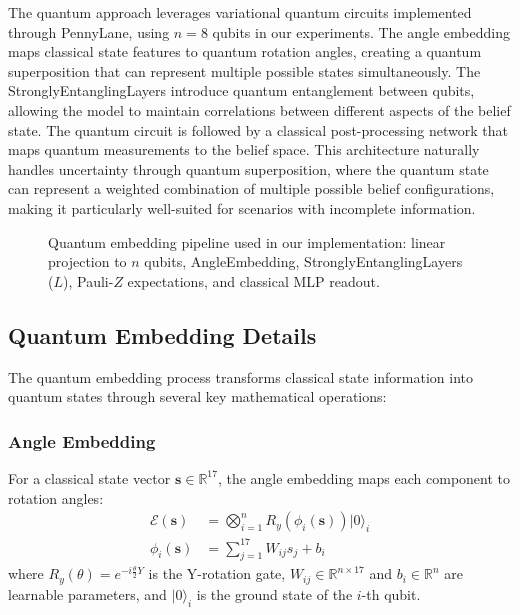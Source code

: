 \documentclass[11pt]{article}
\begin{document}
The quantum approach leverages variational quantum circuits implemented through PennyLane, using $n=8$ qubits in our experiments. The angle embedding maps classical state features to quantum rotation angles, creating a quantum superposition that can represent multiple possible states simultaneously. The StronglyEntanglingLayers introduce quantum entanglement between qubits, allowing the model to maintain correlations between different aspects of the belief state. The quantum circuit is followed by a classical post-processing network that maps quantum measurements to the belief space. This architecture naturally handles uncertainty through quantum superposition, where the quantum state can represent a weighted combination of multiple possible belief configurations, making it particularly well-suited for scenarios with incomplete information.

\begin{figure}[t]
\centering

\caption{Quantum embedding pipeline used in our implementation: linear projection to $n$ qubits, AngleEmbedding, StronglyEntanglingLayers ($L$), Pauli-$Z$ expectations, and classical MLP readout.}
\label{fig:quantum-embedding}
\end{figure}

\subsection{Quantum Embedding Details}

The quantum embedding process transforms classical state information into quantum states through several key mathematical operations:

\subsubsection{Angle Embedding}
For a classical state vector $\mathbf{s} \in \mathbb{R}^{17}$, the angle embedding maps each component to rotation angles:
\begin{align}
    \mathcal{E}(\mathbf{s}) &= \bigotimes_{i=1}^{n} R_y(\phi_i(\mathbf{s}))|0\rangle_i \\
    \phi_i(\mathbf{s}) &= \sum_{j=1}^{17} W_{ij} s_j + b_i
\end{align}
where $R_y(\theta) = e^{-i\frac{\theta}{2}Y}$ is the Y-rotation gate, $W_{ij} \in \mathbb{R}^{n \times 17}$ and $b_i \in \mathbb{R}^n$ are learnable parameters, and $|0\rangle_i$ is the ground state of the $i$-th qubit.
\end{document}
